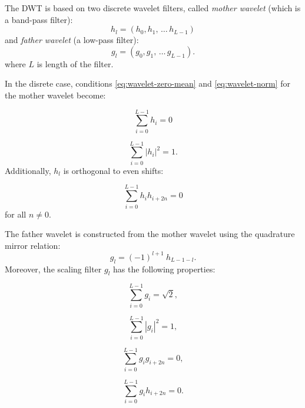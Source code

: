 The DWT is based on two discrete wavelet filters, called \emph{mother wavelet}
(which is a band-pass filter):
\begin{equation}
h_l=(h_0, h_1, \, \ldots \, h_{L-1})
\end{equation}
and \emph{father wavelet} (a low-pass filter):
\begin{equation}
g_l=(g_0, g_1, \, \ldots \, g_{L-1}).
\end{equation}
where $L$ is length of the filter.

In the disrete case, conditions \ref{eq:wavelet-zero-mean} and \ref{eq:wavelet-norm} for the mother wavelet become:

\begin{equation}
	\sum_{i=0}^{L-1} h_i = 0
\end{equation}

\begin{equation}
	\sum_{i=0}^{L-1} |h_i|^2 = 1.
\end{equation}
Additionally, $h_l$ is orthogonal to even shifts:

\begin{equation}
	\sum_{i=0}^{L-1} h_i h_{i+2n} = 0
\end{equation}
for all $n \neq 0$.

The father wavelet is constructed from the mother wavelet using the quadrature mirror relation:
\begin{equation}
	g_l = (-1)^{l+1} \:  h_{L-1-l}.
\end{equation}
Moreover, the scaling filter $g_l$ has the following properties:
\begin{center}
\noindent
\begin{minipage}[t]{\minipagewidth}
\begin{equation}
	\sum_{i=0}^{L-1} g_i = \sqrt{2},
\end{equation}
\end{minipage}
\begin{minipage}[t]{\minipagewidth}
\begin{equation}
	\sum_{i=0}^{L-1} |g_i|^2 = 1,
\end{equation}
\end{minipage}

\begin{minipage}[t]{\minipagewidth}
\begin{equation}
	\sum_{i=0}^{L-1} g_i g_{i+2n} = 0,
\end{equation}
\end{minipage}
\begin{minipage}[t]{\minipagewidth}
\begin{equation}
	\sum_{i=0}^{L-1} g_i h_{i+2n} = 0.
\end{equation}
\end{minipage}
\end{center}


